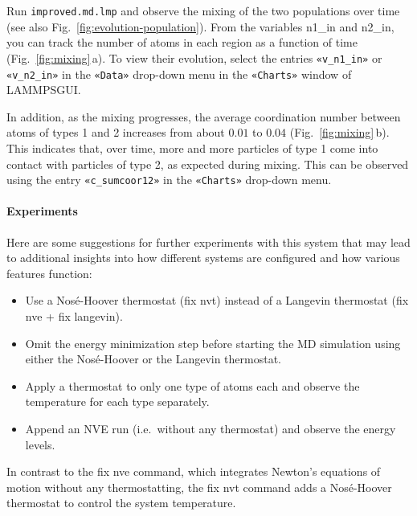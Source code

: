 \documentclass[9pt,tutorial]{livecoms}
\newcommand{\lmpcmd}[1]{\hspace{0pt}\colorbox{listing}{\textcolor{command}{\small{#1}}}\hspace{0pt}} %
\newcommand{\flecmd}[1]{\textcolor{command}{\texttt{#1}}} %
\newcommand{\guicmd}[1]{\textcolor{command}{\texttt{«#1»}}} %
\newcommand{\lammpsgui}{\textsf{LAMMPS\textendash GUI}}
\begin{document}
Run \flecmd{improved.md.lmp} and observe the mixing of the two populations
over time (see also Fig.~\ref{fig:evolution-population}).  From the
variables \lmpcmd{n1\_in} and \lmpcmd{n2\_in}, you can track the number
of atoms in each region as a function of time
(Fig.~\ref{fig:mixing}\,a).  To view their evolution, select the entries
\guicmd{v\_n1\_in} or \guicmd{v\_n2\_in} in the \guicmd{Data} drop-down
menu in the \guicmd{Charts} window of \lammpsgui{}.

In addition, as the mixing progresses, the average coordination number
between atoms of types 1 and 2 increases from about $0.01$ to $0.04$
(Fig.~\ref{fig:mixing}\,b).  This indicates that, over time, more and
more particles of type 1 come into contact with particles of type 2, as
expected during mixing.  This can be observed using the entry
\guicmd{c\_sumcoor12} in the \guicmd{Charts} drop-down menu.

\paragraph{Experiments}

Here are some suggestions for further experiments with this system that
may lead to additional insights into how different systems are configured
and how various features function:
\begin{itemize}
\item Use a Nos\'e-Hoover thermostat (\lmpcmd{fix nvt}) instead of a Langevin thermostat
  (\lmpcmd{fix nve} + \lmpcmd{fix langevin}).
\item Omit the energy minimization step before starting the MD simulation using either
the Nos\'e-Hoover or the Langevin thermostat.
\item Apply a thermostat to only one type of atoms each and observe the
  temperature for each type separately.
\item Append an NVE run (i.e.~without any thermostat) and observe the energy levels.
\end{itemize}

\begin{note}
{\color{blue}
In contrast to the \lmpcmd{fix nve} command, which integrates Newton's equations
of motion without any thermostatting, the \lmpcmd{fix nvt} command adds a Nosé-Hoover
thermostat to control the system temperature.}
\end{note}
\end{document}

